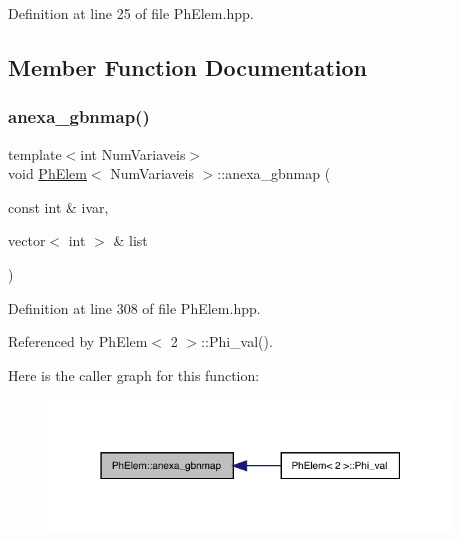 Definition at line 25 of file Ph\+Elem.\+hpp.



\subsection{Member Function Documentation}
\mbox{\label{classPhElem_a4da3f8bc24014789f4685c9a611a11dc}} 
\subsubsection{\texorpdfstring{anexa\+\_\+gbnmap()}{anexa\_gbnmap()}}
{\footnotesize\ttfamily template$<$int Num\+Variaveis$>$ \\
void \hyperlink{classPhElem}{Ph\+Elem}$<$ Num\+Variaveis $>$\+::anexa\+\_\+gbnmap (\begin{DoxyParamCaption}\item[{const int \&}]{ivar,  }\item[{vector$<$ int $>$ \&}]{list }\end{DoxyParamCaption})}



Definition at line 308 of file Ph\+Elem.\+hpp.



Referenced by Ph\+Elem$<$ 2 $>$\+::\+Phi\+\_\+val().

Here is the caller graph for this function\+:
\nopagebreak
\begin{figure}[H]
\begin{center}
\leavevmode
\includegraphics[width=304pt]{classPhElem_a4da3f8bc24014789f4685c9a611a11dc_icgraph}
\end{center}
\end{figure}
\mbox{\label{classPhElem_ac6ea940519c924130a4cb44bbab2a31d}} 
